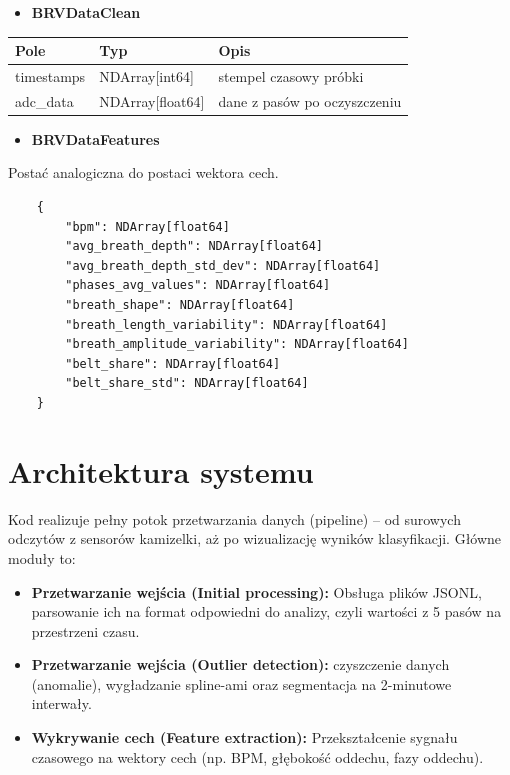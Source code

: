     \begin{itemize}
        \item \textbf{BRVDataClean}\\
    \end{itemize}
    
    \begin{center}
        \begin{tabular}{|l|l|l|}
            \hline
            Pole & Typ & Opis \\
            \hline
            timestamps & NDArray[int64] & stempel czasowy próbki \\
            \hline
            adc\_data & NDArray[float64] & dane z pasów po oczyszczeniu \\
            \hline
        \end{tabular}
    \end{center}

    \begin{itemize}
        \item \textbf{BRVDataFeatures}\\
    \end{itemize}
    
    Postać analogiczna do postaci wektora cech.
    \begin{center}
    \begin{verbatim}
    {
        "bpm": NDArray[float64] 
        "avg_breath_depth": NDArray[float64] 
        "avg_breath_depth_std_dev": NDArray[float64] 
        "phases_avg_values": NDArray[float64]
        "breath_shape": NDArray[float64] 
        "breath_length_variability": NDArray[float64]
        "breath_amplitude_variability": NDArray[float64]
        "belt_share": NDArray[float64]  
        "belt_share_std": NDArray[float64] 
    }
    \end{verbatim}
    \end{center}

\section{Architektura systemu}
Kod realizuje pełny potok przetwarzania danych (pipeline) – od surowych odczytów
z sensorów kamizelki, aż po wizualizację wyników klasyfikacji. Główne moduły to:

\begin{itemize}
    \item \textbf{Przetwarzanie wejścia (Initial processing):}
        Obsługa plików JSONL, parsowanie ich na format odpowiedni do analizy, czyli wartości z
        5 pasów na przestrzeni czasu.
    \item \textbf{Przetwarzanie wejścia (Outlier detection):}
        czyszczenie danych (anomalie), wygładzanie spline-ami oraz 
        segmentacja na 2-minutowe interwały.
    \item \textbf{Wykrywanie cech (Feature extraction):} 
        Przekształcenie sygnału czasowego na wektory cech (np. BPM, głębokość oddechu, fazy oddechu).
\end{itemize}

